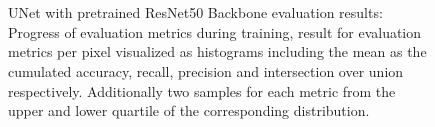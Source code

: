 \documentclass[lettersize,journal]{IEEEtran}
\begin{document}
\begin{figure}[h]
  \centering
  \\
  \\
  \caption{UNet with pretrained ResNet50 Backbone evaluation results: Progress of evaluation metrics during training, result for evaluation metrics per pixel visualized as histograms including the mean as the cumulated accuracy, recall, precision and intersection over union respectively. Additionally two samples for each metric from the upper and lower quartile of the corresponding distribution.}
  \label{fig:eval_pt}
\end{figure}
\end{document}
